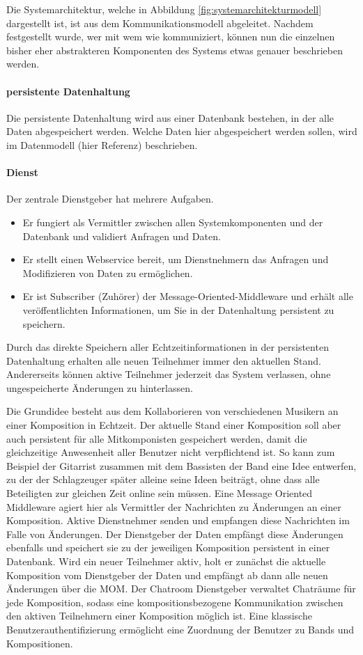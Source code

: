 \documentclass[12pt]{scrartcl}
\begin{document}
Die Systemarchitektur, welche in Abbildung \ref{fig:systemarchitekturmodell} dargestellt ist, ist aus dem Kommunikationsmodell abgeleitet. Nachdem festgestellt wurde, wer mit wem wie kommuniziert, können nun die einzelnen bisher eher abstrakteren Komponenten des Systems etwas genauer beschrieben werden.

\paragraph{persistente Datenhaltung}
Die persistente Datenhaltung wird aus einer Datenbank bestehen, in der alle Daten abgespeichert werden. Welche Daten hier abgespeichert werden sollen, wird im Datenmodell (hier Referenz) beschrieben.

\paragraph{Dienst}
Der zentrale Dienstgeber hat mehrere Aufgaben.
\begin{itemize}
\item Er fungiert als Vermittler zwischen allen Systemkomponenten und der Datenbank und validiert Anfragen und Daten.
\item Er stellt einen Webservice bereit, um Dienstnehmern das Anfragen und Modifizieren von Daten zu ermöglichen.
\item Er ist Subscriber (Zuhörer) der Message-Oriented-Middleware und erhält alle veröffentlichten Informationen, um Sie in der Datenhaltung persistent zu speichern.
\end{itemize}

Durch das direkte Speichern aller Echtzeitinformationen in der persistenten Datenhaltung erhalten alle neuen Teilnehmer immer den aktuellen Stand. Andererseits können aktive Teilnehmer jederzeit das System verlassen, ohne ungespeicherte Änderungen zu hinterlassen.


Die Grundidee besteht aus dem Kollaborieren von verschiedenen Musikern an einer Komposition in Echtzeit. Der aktuelle Stand einer Komposition soll aber auch persistent für alle Mitkomponisten gespeichert werden, damit die gleichzeitige Anwesenheit aller Benutzer nicht verpflichtend ist. So kann zum Beispiel der Gitarrist zusammen mit dem Bassisten der Band eine Idee entwerfen, zu der der Schlagzeuger später alleine seine Ideen beiträgt, ohne dass alle Beteiligten zur gleichen Zeit online sein müssen.
Eine Message Oriented Middleware agiert hier als Vermittler der Nachrichten zu Änderungen an einer Komposition. Aktive Dienstnehmer senden und empfangen diese Nachrichten im Falle von Änderungen. Der Dienstgeber der Daten empfängt diese Änderungen ebenfalls und speichert sie zu der jeweiligen Komposition persistent in einer Datenbank. Wird ein neuer Teilnehmer aktiv, holt er zunächst die aktuelle Komposition vom Dienstgeber der Daten und empfängt ab dann alle neuen Änderungen über die MOM.
Der Chatroom Dienstgeber verwaltet Chaträume für jede Komposition, sodass eine kompositionsbezogene Kommunikation zwischen den aktiven Teilnehmern einer Komposition möglich ist.
Eine klassische Benutzerauthentifizierung ermöglicht eine Zuordnung der Benutzer zu Bands und Kompositionen.
\end{document}
